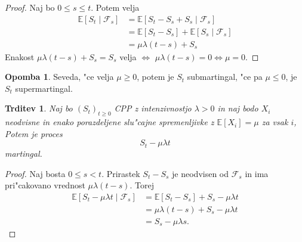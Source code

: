 \documentclass[12pt, a4paper, reqno]{amsart}
\theoremstyle{definition} %
\newtheorem{opomba}[definicija]{Opomba}
\theoremstyle{plain} %
\newtheorem{trditev}[definicija]{Trditev}
\newcommand{\R}{\mathbb{R}}
\newcommand{\E}{\mathbb{E}}
\newcommand{\F}{\mathcal{F}}
\newcommand{\1}{\mathds{1}}
\begin{document}
        \begin{proof}
            Naj bo $0\leq s\leq t$. Potem velja
            \begin{align*}
                \E\left[S_t\mid\F_s\right] 
                        &= \E\left[S_t - S_s + S_s\mid \F_s\right] \\
                        &= \E\left[S_t - S_s\right] + \E\left[S_s\mid \F_s\right] \\
                        &= \mu\lambda(t-s) + S_s
            \end{align*}
           Enakost $\mu\lambda(t-s) + S_s = S_s$ velja $\iff$ $\mu\lambda(t-s) = 0 \iff \mu = 0$.
        \end{proof}

        \begin{opomba}
            Seveda, "ce velja $\mu \geq 0$, potem je $S_t$ submartingal, "ce pa $\mu \leq 0$, je
            $S_t$ supermartingal.
        \end{opomba}

        \begin{trditev}
            Naj bo $(S_t)_{t\geq0}$ CPP z intenzivnostjo $\lambda > 0$ in naj bodo $X_i$ neodvisne
            in enako porazdeljene slu"cajne spremenljivke z $\E\left[X_i\right] = \mu$ za vsak $i$,
            Potem je proces 
            $$
                S_t - \mu\lambda t
            $$
            martingal.
            \label{trd:CPPpostanemartingal}
        \end{trditev}

        \begin{proof}
            Naj bosta $0 \leq s < t$. Prirastek $S_t - S_s$ je neodvisen od $\F_s$ in ima 
            pri"cakovano vrednost $\mu\lambda(t-s)$. Torej 
            \begin{align*}
                \E\left[S_t - \mu\lambda t\mid\F_s\right] 
                        &= \E\left[S_t - S_s\right] + S_s - \mu\lambda t\\
                        &= \mu\lambda(t-s) + S_s - \mu\lambda t\\
                        &= S_s - \mu\lambda s.
            \end{align*}
        \end{proof}

\end{document}
